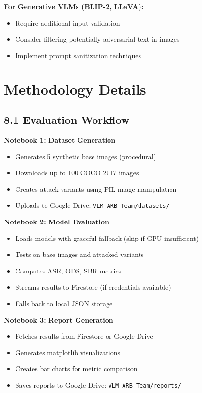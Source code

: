 \documentclass[12pt, a4paper]{article}
\begin{document}
\textbf{For Generative VLMs (BLIP-2, LLaVA):}
\begin{itemize}
    \item Require additional input validation
    \item Consider filtering potentially adversarial text in images
    \item Implement prompt sanitization techniques
\end{itemize}

\section{Methodology Details}

\subsection{8.1 Evaluation Workflow}

\textbf{Notebook 1: Dataset Generation}
\begin{itemize}
    \item Generates 5 synthetic base images (procedural)
    \item Downloads up to 100 COCO 2017 images
    \item Creates attack variants using PIL image manipulation
    \item Uploads to Google Drive: \texttt{VLM-ARB-Team/datasets/}
\end{itemize}

\textbf{Notebook 2: Model Evaluation}
\begin{itemize}
    \item Loads models with graceful fallback (skip if GPU insufficient)
    \item Tests on base images and attacked variants
    \item Computes ASR, ODS, SBR metrics
    \item Streams results to Firestore (if credentials available)
    \item Falls back to local JSON storage
\end{itemize}

\textbf{Notebook 3: Report Generation}
\begin{itemize}
    \item Fetches results from Firestore or Google Drive
    \item Generates matplotlib visualizations
    \item Creates bar charts for metric comparison
    \item Saves reports to Google Drive: \texttt{VLM-ARB-Team/reports/}
\end{itemize}
\end{document}

